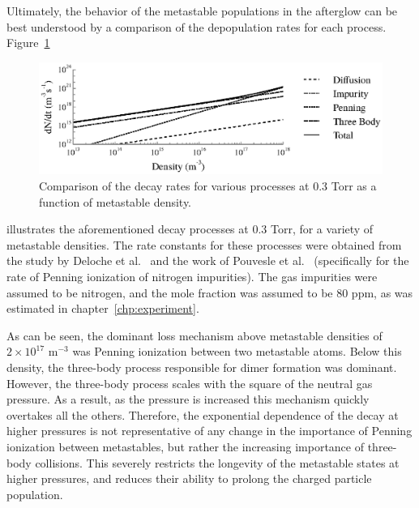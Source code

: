 Ultimately, the behavior of the metastable populations in the afterglow can be
best understood by a comparison of the depopulation rates for each process.
Figure~\ref{fig:decay}
\begin{figure}
  \centering
  \includegraphics{./chapters/metastables/figures/decay.eps}
  \caption{Comparison of the decay rates for various processes at 0.3 Torr as a
  function of metastable density.}
  \label{fig:decay}
\end{figure}
illustrates the aforementioned decay processes at 0.3 Torr, for a variety of
metastable densities. The rate constants for these processes were obtained from
the study by Deloche et al.~\cite{Deloche1976} and the work of Pouvesle et
al.~\cite{Pouvesle1988} (specifically for the rate of Penning ionization of
nitrogen impurities). The gas impurities were assumed to be nitrogen, and the
mole fraction was assumed to be 80 ppm, as was estimated in
chapter~\ref{chp:experiment}.

As can be seen, the dominant loss mechanism above metastable densities of
$2\times10^{17}$ m$^{-3}$ was Penning ionization between two metastable atoms.
Below this density, the three-body process responsible for dimer formation was
dominant. However, the three-body process scales with the square of the neutral
gas pressure. As a result, as the pressure is increased this mechanism quickly
overtakes all the others. Therefore, the exponential dependence of the decay at
higher pressures is not representative of any change in the importance of
Penning ionization between metastables, but rather the increasing importance of
three-body collisions. This severely restricts the longevity of the metastable
states at higher pressures, and reduces their ability to prolong the charged
particle population.

